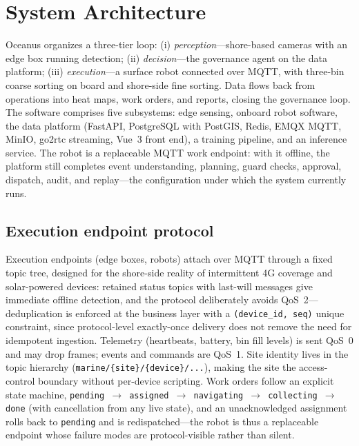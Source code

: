 \documentclass[conference]{IEEEtran}
\begin{document}
\section{System Architecture}
Oceanus organizes a three-tier loop: (i) \emph{perception}---shore-based
cameras with an edge box running detection; (ii) \emph{decision}---the
governance agent on the data platform; (iii) \emph{execution}---a surface
robot connected over MQTT, with three-bin coarse sorting on board and
shore-side fine sorting. Data flows back from operations into heat maps,
work orders, and reports, closing the governance loop. The software
comprises five subsystems: edge sensing, onboard robot software, the data
platform (FastAPI, PostgreSQL with PostGIS, Redis, EMQX MQTT, MinIO,
go2rtc streaming, Vue~3 front end), a training pipeline, and an inference
service. The robot is a replaceable MQTT work endpoint: with it offline, the
platform still completes event understanding, planning, guard checks,
approval, dispatch, audit, and replay---the configuration under which the
system currently runs.

\subsection{Execution endpoint protocol}
Execution endpoints (edge boxes, robots) attach over MQTT through a fixed
topic tree, designed for the shore-side reality of intermittent 4G coverage
and solar-powered devices: retained status topics with last-will messages
give immediate offline detection, and the protocol deliberately avoids
QoS~2---deduplication is enforced at the business layer with a
\texttt{(device\_id, seq)} unique constraint, since protocol-level
exactly-once delivery does not remove the need for idempotent ingestion.
Telemetry (heartbeats, battery, bin fill levels) is sent QoS~0 and may drop
frames; events and commands are QoS~1. Site identity lives in the topic
hierarchy (\texttt{marine/\{site\}/\{device\}/...}), making the site the
access-control boundary without per-device scripting. Work orders follow an
explicit state machine,
\texttt{pending $\to$ assigned $\to$ navigating $\to$ collecting $\to$ done}
(with cancellation from any live state), and an unacknowledged assignment
rolls back to \texttt{pending} and is redispatched---the robot is thus a
replaceable endpoint whose failure modes are protocol-visible rather than
silent.
\end{document}
